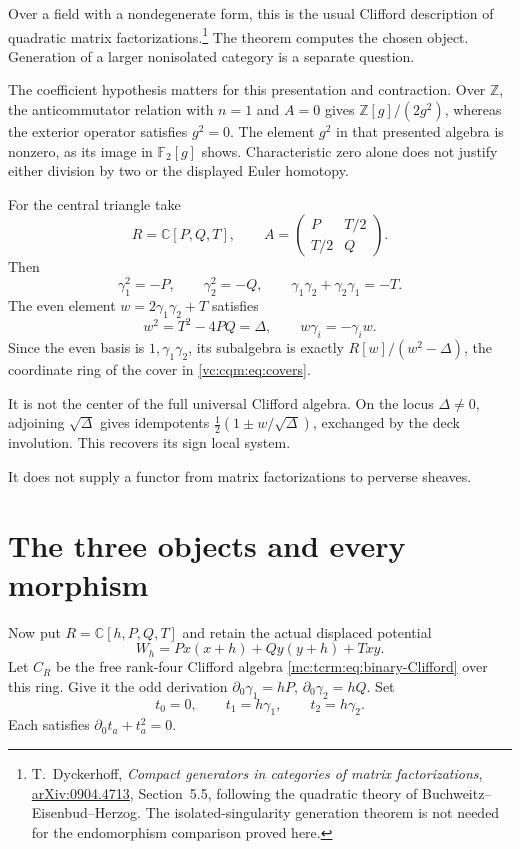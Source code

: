 Over a field with a nondegenerate form, this is the
usual Clifford description of quadratic matrix
factorizations.\footnote{T.~Dyckerhoff,
\emph{Compact generators in categories of matrix
factorizations},
\href{https://arxiv.org/abs/0904.4713}{arXiv:0904.4713},
Section~5.5, following the quadratic theory of
Buchweitz--Eisenbud--Herzog. The isolated-singularity
generation theorem is not needed for the endomorphism
comparison proved here.}
The theorem computes the chosen object. Generation
of a larger nonisolated category is a separate question.

The coefficient hypothesis matters for this presentation
and contraction. Over $\mathbb Z$, the anticommutator
relation with $n=1$ and $A=0$ gives
$\mathbb Z[g]/(2g^2)$, whereas the exterior operator
satisfies $g^2=0$. The element $g^2$ in that presented
algebra is nonzero, as its image in $\mathbb F_2[g]$
shows. Characteristic zero alone does not justify
either division by two or the displayed Euler homotopy.

For the central triangle take
\[
 R=\mathbb C[P,Q,T],\qquad
 A=\begin{pmatrix}P&T/2\\T/2&Q\end{pmatrix}.
\]
Then
\begin{equation}\label{mc:tcrm:eq:binary-Clifford}
 \gamma_1^2=-P,\qquad \gamma_2^2=-Q,
 \qquad \gamma_1\gamma_2+\gamma_2\gamma_1=-T.
\end{equation}
The even element $w=2\gamma_1\gamma_2+T$ satisfies
\begin{equation}\label{mc:tcrm:eq:even-cover}
 w^2=T^2-4PQ=\Delta,
 \qquad w\gamma_i=-\gamma_iw.
\end{equation}
Since the even basis is $1,\gamma_1\gamma_2$, its
subalgebra is exactly $R[w]/(w^2-\Delta)$, the
coordinate ring of the cover in \eqref{vc:cqm:eq:covers}.

It is not the center of the full universal Clifford
algebra. On the locus $\Delta\ne0$, adjoining
$\sqrt\Delta$ gives idempotents
$\tfrac12(1\pm w/\sqrt\Delta)$, exchanged by the
deck involution. This recovers its sign local system.

It does not supply a functor from matrix factorizations
to perverse sheaves.

\section{The three objects and every morphism}

Now put $R=\mathbb C[h,P,Q,T]$ and retain the
actual displaced potential
\begin{equation}\label{mc:tcrm:eq:potential}
 W_h=Px(x+h)+Qy(y+h)+Txy.
\end{equation}
Let $C_R$ be the free rank-four Clifford algebra
\eqref{mc:tcrm:eq:binary-Clifford} over this ring.
Give it the odd derivation
$\partial_0\gamma_1=hP$, $\partial_0\gamma_2=hQ$.
Set
\[
 t_0=0,\qquad t_1=h\gamma_1,\qquad t_2=h\gamma_2.
\]
Each satisfies $\partial_0t_a+t_a^2=0$.

